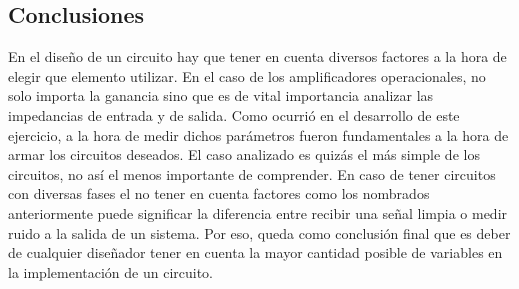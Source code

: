 \subsection{Conclusiones}

En el diseño de un circuito hay que tener en cuenta diversos factores a la hora de elegir que elemento utilizar. En el caso de los amplificadores operacionales, no solo importa la ganancia sino que es de vital importancia analizar las impedancias de entrada y de salida. Como ocurrió en el desarrollo de este ejercicio, a la hora de medir dichos parámetros fueron fundamentales a la hora de armar los circuitos deseados. El caso analizado es quizás el más simple de los circuitos, no así el menos importante de comprender. En caso de tener circuitos con diversas fases el no tener en cuenta factores como los nombrados anteriormente puede significar la diferencia entre recibir una señal limpia o medir ruido a la salida de un sistema. Por eso, queda como conclusión final que es deber de cualquier diseñador tener en cuenta la mayor cantidad posible de variables en la implementación de un circuito.